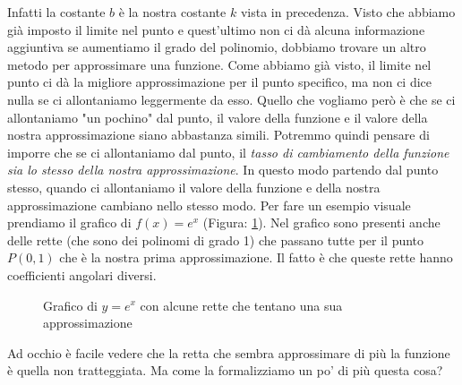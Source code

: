 Infatti la costante $b$ è la nostra costante $k$ vista in precedenza. Visto che 
abbiamo già imposto il limite nel punto e quest'ultimo non ci dà alcuna 
informazione aggiuntiva se aumentiamo il grado del polinomio, dobbiamo trovare 
un altro metodo per approssimare una funzione. Come abbiamo già visto, il 
limite nel punto ci dà la migliore approssimazione per il punto specifico, ma 
non ci dice nulla se ci allontaniamo leggermente da esso. Quello che vogliamo 
però è che se ci allontaniamo "un pochino" dal punto, il valore della funzione 
e il valore della nostra approssimazione siano abbastanza simili. Potremmo 
quindi pensare di imporre che se ci allontaniamo dal punto, il \textit{tasso 
di cambiamento della funzione sia lo stesso della nostra approssimazione}. In 
questo modo partendo dal punto stesso, quando ci allontaniamo il valore della 
funzione e della nostra approssimazione cambiano nello stesso modo. Per fare un 
esempio visuale prendiamo il grafico di $f(x) = e^x$ (Figura: 
\ref{fig_esponenzialeGrafico}). Nel grafico sono presenti anche delle rette 
(che sono dei polinomi di grado 1) che passano tutte per il punto $P(0, 1)$ che 
è la nostra prima approssimazione. Il fatto è che queste rette hanno 
coefficienti angolari diversi.

\begin{figure}[h]
\centering
{}
\caption{Grafico di $y = e^x$ con alcune rette che tentano una sua 
    approssimazione}
	\label{fig_esponenzialeGrafico}
\end{figure}


Ad occhio è facile vedere che la retta che sembra approssimare di più la 
funzione è quella non tratteggiata. Ma come la formalizziamo un po' di più 
questa cosa?

